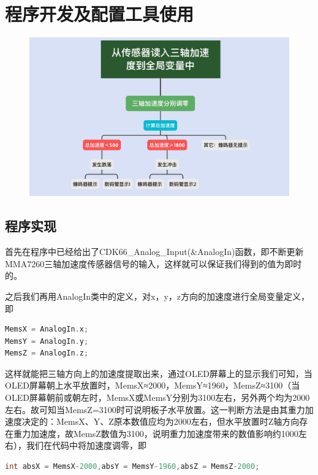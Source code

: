 \section{程序开发及配置工具使用}

\begin{figure}[H]
\centering
\includegraphics[width=16cm]{figure/4.1.1.png}
\label{fig:4.1.1}
\end{figure}

\subsection{程序实现}
\par{首先在程序中已经给出了CDK66\_Analog\_Input(\&AnalogIn)函数，即不断更新MMA7260三轴加速度传感器信号的输入，这样就可以保证我们得到的值为即时的。}
\par{之后我们再用AnalogIn类中的定义，对x，y，z方向的加速度进行全局变量定义，即}

\begin{lstlisting}[language = C++]
MemsX = AnalogIn.x;
MemsY = AnalogIn.y;
MemsZ = AnalogIn.z;
\end{lstlisting}

\par{这样就能把三轴方向上的加速度提取出来，通过OLED屏幕上的显示我们可知，当OLED屏幕朝上水平放置时，MemsX≈2000，MemsY≈1960，MemsZ≈3100（当OLED屏幕朝前或朝左时，MemsX或MemsY分别为3100左右，另外两个均为2000左右。故可知当MemsZ=3100时可说明板子水平放置。这一判断方法是由其重力加速度决定的：MemsX、Y、Z原本数值应均为2000左右，但水平放置时Z轴方向存在重力加速度，故MemsZ数值为3100，说明重力加速度带来的数值影响约1000左右），我们在代码中将加速度调零，即
}

\begin{lstlisting}[language = C++]
int absX = MemsX-2000,absY = MemsY-1960,absZ = MemsZ-2000;
\end{lstlisting}



